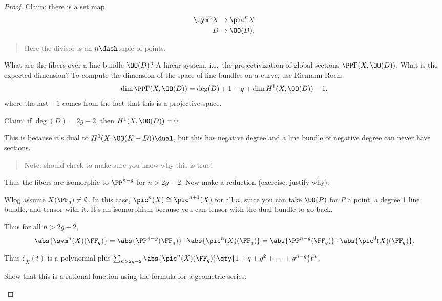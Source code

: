 \begin{proof}

Claim: there is a set map
\begin{align*}  
\sym^n X &\to \pic^n X \\
D &\mapsto \OO(D)
.\end{align*}

\begin{quote}
Here the divisor is an \(n\dash\)tuple of points.
\end{quote}

What are the fibers over a line bundle \(\OO(D)\)? A linear system,
i.e.~the projectivization of global sections \(\PP \Gamma(X, \OO(D))\).
What is the expected dimension? To compute the dimension of the space of
line bundles on a curve, use Riemann-Roch:
\begin{align*}  
\dim \PP\Gamma(X, \OO(D)) = \deg(D) + 1 - g + \dim H^1(X, \OO(D)) - 1
.\end{align*} where the last \(-1\) comes from the fact that this is a
projective space.

Claim: if \(\deg(D) = 2g-2\), then \(H^1(X, \OO(D)) = 0\).

This is because it's dual to \(H^0(X, \OO(K-D))\dual\), but this has
negative degree and a line bundle of negative degree can never have
sections.

\begin{quote}
Note: should check to make sure you know why this is true!
\end{quote}

Thus the fibers are isomorphic to \(\PP^{n-g}\) for \(n>2g-2\). Now make
a reduction (exercise: justify why):

Wlog assume \(X(\FF_q) \neq \emptyset\). In this case,
\(\pic^n(X) \cong \pic^{n+1}(X)\) for all \(n\), since you can take
\(\OO(P)\) for \(P\) a point, a degree 1 line bundle, and tensor with
it. It's an isomorphism because you can tensor with the dual bundle to
go back.

Thus for all \(n>2g-2\),
\begin{align*}  
\abs{\sym^n(X)(\FF_q)} 
= \abs{\PP^{n-g}(\FF_q)} \cdot \abs{\pic^n(X)(\FF_q)}
= \abs{\PP^{n-g}(\FF_q)} \cdot \abs{\pic^0(X)(\FF_q)}
.\end{align*}

Thus \(\zeta_X(t)\) is a polynomial plus
\(\sum_{n>2g-2} \abs{\pic^n(X)(\FF_q)}\qty{1+q+q^2+\cdots+q^{n-g}}t^n\).

\begin{exercise}

Show that this is a rational function using the formula for a geometric
series.

\end{exercise}

\end{proof}


